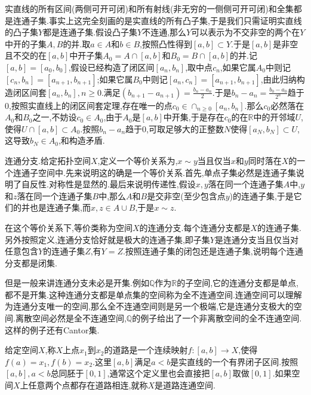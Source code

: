 实直线的所有区间(两侧可开可闭)和所有射线(非无穷的一侧侧可开可闭)和全集都是连通子集.事实上这完全刻画的是实直线的所有凸子集,于是我们只需证明实直线的凸子集$Y$都是连通子集.假设凸子集$Y$不连通,那么$Y$可以表示为不交非空的两个在$Y$中开的子集$A,B$的并.取$a\in A$和$b\in B$,按照凸性得到$[a,b]\subset Y$.于是$[a,b]$是非空且不交的在$[a,b]$中开子集$A_0=A\cap[a,b]$和$B_0=B\cap[a,b]$的并.记$[a,b]=[a_0,b_0]$,假设已经构造了闭区间$[a_n,b_n]$,取中点$c_n$,如果它属$A_0$中则记$[c_n,b_n]=[a_{n+1},b_{n+1}]$;如果它属$B_0$中则记$[a_n,c_n]=[a_{n+1},b_{n+1}]$,由此归纳构造闭区间套$[a_n,b_n],n\ge0$.满足$(b_{n+1}-a_{n+1})=\frac{b_n-a_n}{2}$.于是$b_n-a_n=\frac{b_0-a_0}{2^n}$趋于0,按照实直线上的闭区间套定理,存在唯一的点$c_0\in\cap_{n\ge0}[a_n,b_n]$.那么$c_0$必然落在$A_0$和$B_0$之一,不妨设$c_0\in A_0$,由于$A_0$是$[a,b]$中开集,于是存在$c_0$的在$\mathbb{R}$中的开邻域$U$,使得$U\cap[a,b]\subset A_0$.按照$b_n-a_n$趋于0,可取足够大的正整数$N$使得$[a_N,b_N]\subset U$,这导致$b_N\in A_0$,和构造矛盾.

连通分支.给定拓扑空间$X$,定义一个等价关系为,$x\sim y$当且仅当$x$和$y$同时落在$X$的一个连通子空间中.先来说明这的确是一个等价关系.首先,单点子集必然是连通子集说明了自反性.对称性是显然的.最后来说明传递性,假设$x,y$落在同一个连通子集$A$中,$y$和$z$落在同一个连通子集$B$中,那么$A$和$B$是交非空(至少包含点$y$)的连通子集,于是它们的并也是连通子集,而$x,z\in A\cup B$,于是$x\sim z$.

在这个等价关系下,等价类称为空间$X$的连通分支.每个连通分支都是$X$的连通子集.另外按照定义,连通分支恰好就是极大的连通子集,即子集$Y$是连通分支当且仅当对任意包含$Y$的连通子集$Z$,有$Y=Z$.按照连通子集的闭包还是连通子集,说明每个连通分支都是闭集.

但是一般来讲连通分支未必是开集.例如$\mathbb{Q}$作为$\mathbb{R}$的子空间,它的连通分支都是单点,都不是开集.这种连通分支都是单点集的空间称为全不连通空间.连通空间可以理解为连通分支唯一的空间,那么全不连通空间则是另一个极端,它是连通分支极大的空间.离散空间必然是全不连通空间,$\mathbb{Q}$的例子给出了一个非离散空间的全不连通空间.这样的例子还有Cantor集.

给定空间$X$,称$X$上点$x_1$到$x_2$的道路是一个连续映射$f:[a,b]\to X$,使得$f(a)=x_1,f(b)=x_2$.这里$[a,b]$满足$a<b$是实直线的一个有界闭子区间.按照$[a,b],a<b$总同胚于$[0,1]$,通常这个定义里也会直接把$[a,b]$取做$[0,1]$.如果空间$X$上任意两个点都存在道路相连,就称$X$是道路连通空间.

